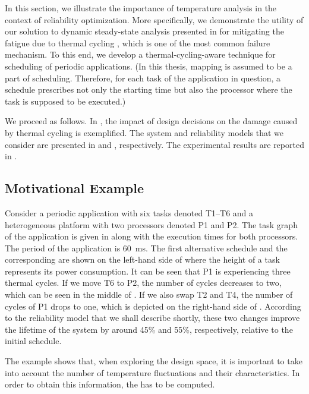 In this section, we illustrate the importance of temperature analysis in the
context of reliability optimization. More specifically, we demonstrate the
utility of our solution to dynamic steady-state analysis presented in
 for mitigating the fatigue due to thermal
cycling \cite{jedec2010}, which is one of the most common failure mechanism. To
this end, we develop a thermal-cycling-aware technique for scheduling of
periodic applications. (In this thesis, mapping is assumed to be a part of
scheduling. Therefore, for each task of the application in question, a schedule
prescribes not only the starting time but also the processor where the task is
supposed to be executed.)

We proceed as follows. In , the impact of
design decisions on the damage caused by thermal cycling is exemplified. The
system and reliability models that we consider are presented in
 and , respectively. The experimental
results are reported in .

\subsection{Motivational Example}

Consider a periodic application with six tasks denoted T1--T6 and a
heterogeneous platform with two processors denoted P1 and P2. The task graph of
the application is given in  along with the
execution times for both processors. The period of the application is 60~ms. The
first alternative schedule and the corresponding  are shown on the
left-hand side of  where the height of a task
represents its power consumption. It can be seen that P1 is experiencing three
thermal cycles. If we move T6 to P2, the number of cycles decreases to two,
which can be seen in the middle of . If we also
swap T2 and T4, the number of cycles of P1 drops to one, which is depicted on
the right-hand side of . According to the
reliability model that we shall describe shortly, these two changes improve the
lifetime of the system by around 45\% and 55\%, respectively, relative to the
initial schedule.

The example shows that, when exploring the design space, it is important to
take into account the number of temperature fluctuations and their
characteristics. In order to obtain this information, the  has to be
computed.

